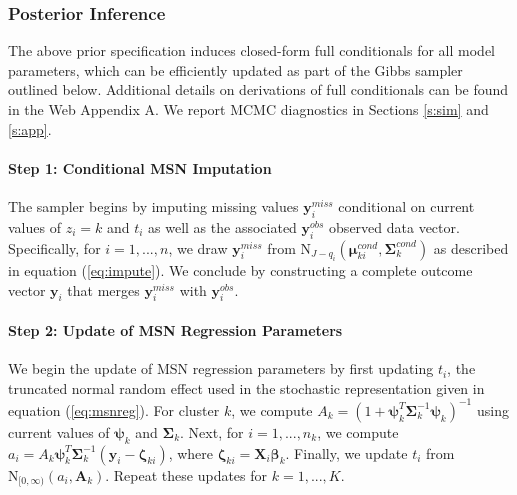 \documentclass[useAMS,referee]{biom}
\begin{document}
\subsubsection{Posterior Inference} 
\label{s:postinf}
The above prior specification induces closed-form full conditionals for all model parameters, which can be efficiently updated as part of the Gibbs sampler outlined below. Additional details on derivations of full conditionals can be found in the Web Appendix A. We report MCMC diagnostics in Sections \ref{s:sim} and \ref{s:app}. 

\paragraph{\textbf{Step 1}: Conditional MSN Imputation} The sampler begins by imputing missing values $\mathbf{y}_i^{miss}$ conditional on current values of $z_i = k$ and $t_i$ as well as the associated $\mathbf{y}_i^{obs}$ observed data vector. Specifically, for $i = 1,...,n$, we draw $\mathbf{y}_i^{miss}$ from $\text{N}_{J-q_i}(\boldsymbol\mu^{cond}_{ki},\boldsymbol\Sigma^{cond}_k)$ as described in equation (\ref{eq:impute}). We conclude by constructing a complete outcome vector $\mathbf{y}_i$ that merges $\mathbf{y}_i^{miss}$ with $\mathbf{y}_i^{obs}$.

\paragraph{\textbf{Step 2:} Update of MSN Regression Parameters} We begin the update of MSN regression parameters by first updating $t_i$, the truncated normal random effect used in the stochastic representation given in equation (\ref{eq:msnreg}). For cluster $k$, we compute $A_k = (1 + \boldsymbol\psi_k^T \boldsymbol\Sigma^{-1}_k\boldsymbol
\psi_k)^{-1}$ using current values of $\boldsymbol\psi_k$ and $\boldsymbol\Sigma_k$. Next, for $i = 1,...,n_k$, we compute $a_i = A_k \boldsymbol\psi_k^T \boldsymbol\Sigma^{-1}_k(\mathbf{y}_i - \boldsymbol\zeta_{ki})$, where $\boldsymbol\zeta_{ki} = \mathbf{X}_i \boldsymbol\beta_k$. Finally, we update $t_i$ from $\text{N}_{[0,\infty)}(a_i, \mathbf{A}_k)$.  Repeat these updates for $k = 1,...,K$. 
\end{document}
